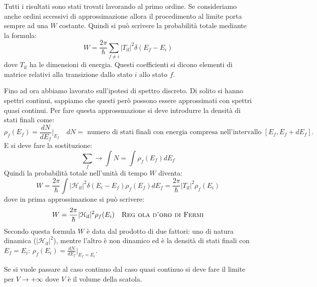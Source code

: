 Tutti i risultati sono stati trovati lavorando al primo ordine. Se consideriamo 
anche ordini sccessivi di approssimazione allora il procedimento al limite 
porta sempre ad una $W$ costante.
Quindi si può scrivere la probabilità totale mediante la formula:
\[
W=\frac{2\pi}{\hbar}\sum_{f\neq i}|T_{\text{if}}|^2\delta(E_f-E_i)
\]
dove $T_{\text{if}}$ ha le dimensioni di energia. Questi coefficienti si dicono 
elementi di matrice relativi alla transizione dallo stato $i$ allo stato $f$.

Fino ad ora abbiamo lavorato sull'ipotesi di spettro discreto. Di solito si 
hanno spettri continui, sappiamo che questi però possono essere approssimati 
con spettri quasi continui.
Per fare questa approssmazione si deve introdurre la densità di stati finali 
come:
\[
\rho_f(E_f)=\frac{dN}{dE_f}|_{E_f}\quad\text{$dN=$ numero di stati finali con 
energia compresa nell'intervallo $[E_f,E_f+dE_f]$.}
\]
E si deve fare la sostituzione:
\[
\sum_f\rightarrow\int N=\int\rho_f(E_f)dE_f
\]
Quindi la probabilità totale nell'unità di tempo $W$ diventa:
\[
W=\frac{2\pi}{\hbar}\int|\mathcal{H}_{\text{if}}|^2\delta(E_i-E_f)\rho_f(E_f)dE_
f=\frac{2\pi}{\hbar}|T_{\text{if}}|^2\rho_f(E_i)
\]
dove in prima approssimazione si può scrivere:
\[
W=\frac{2\pi}{\hbar}|\mathcal{H}_{\text{if}}|^2\rho_f(E_i)\quad\text{\textsc{Reg
ola d'oro
di Fermi}}
\]
Secondo questa formula $W$ è data dal prodotto di due fattori: uno di natura 
dinamica ($|\mathcal{H}_{\text{if}}|^2$), mentre l'altro è non dinamico ed è 
la densità
di stati finali con $E_f=E_i$: $\rho_f(E_i)=\frac{dN}{dE_f}|_{E_f=E_i}$.

Se si vuole passare al caso continuo dal caso quasi continuo si deve fare il 
limite per $V\rightarrow+\infty$ dove $V$ è il volume della scatola.

